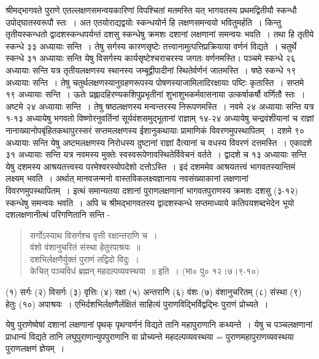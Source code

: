 श्रीमद्भागवते पुराणे एतल्लक्षणसमन्वयकारिणां विपश्चितां मतमस्ति यत् भागवतस्य प्रथमद्वितीयौ स्कन्धौ उपोद्घातस्वरूपौ स्तः~। अत एतयोराद्यद्वयोः स्कन्धयोर्न हि लक्षणसमन्वयो भवितुमर्हति~। किन्तु तृतीयस्कन्धतो द्वादशस्कन्धपर्यन्तं दशसु स्कन्धेषु क्रमशः दशानां लक्षणानां समन्वयः भवति~। तथा हि तृतीये स्कन्धे ३३ अध्यायाः सन्ति~। तेषु सर्गस्य कारणसृष्टेः तत्त्वानामुत्पत्तिप्रक्रियाया वर्णनं विद्यते~। चतुर्थे स्कन्धे ३१ अध्यायाः सन्ति येषु विसर्गस्य कार्यसृष्टेश्चराचरस्य जगतः वर्णनमस्ति। पञ्चमे स्कन्धे २६ अध्यायाः सन्ति यत्र तृतीयलक्षणस्य स्थानस्य जम्बूद्वीपादीनां स्थितेर्वर्णनं जातमस्ति~। षष्ठे स्कन्धे १९ अध्यायाः सन्ति~। तेषु चतुर्थलक्षणस्यानुग्रहणरूपस्य पोषणस्याजामिलादिरक्षायाः पष्टिः कृतास्ति~। सप्तमे १९ अध्यायाः सन्ति~। ऊतेः प्रह्लादहिरण्यकशिपुप्रभृतीनां शुभाशुभकर्मवासनाया उत्कर्षाकर्षौ वर्णितौ स्तः~। अष्टमे २४ अध्यायाः सन्ति~। तेषु षष्ठलक्षणस्य मन्वन्तरस्य निरूपणमस्ति~। नवमे २४ अध्यायाः सन्ति यत्र १-१३ अध्यायेषु भगवतो विष्णोरनुवर्तिनां सूर्यवंशसमुद्भूतानां राज्ञाम् १४-२४ अध्यायेषु चन्द्रवंशीयानां च राज्ञां नानाख्यानोपबृंहितकथापुरस्सरं सप्तमलक्षणस्य ईशानुकथायाः प्रामाणिकं विवरणमुपस्थापितम्~। दशमे ९० अध्यायाः सन्ति येषु अष्टमलक्षणस्य निरोधस्य दुष्टानां राज्ञां दैत्यानां च वधस्य विवरणं दत्तमस्ति~। एकादशे ३१ अध्यायाः सन्ति यत्र नवमस्य मुक्तेः स्वस्वरूपेणावस्थितेर्विवेचनं वर्तते~। द्वादशे च १३ अध्यायाः सन्ति येषु दशमस्य आश्रयतत्त्वस्य परमेश्वरस्योपदेशो दत्तोऽस्ति~। इदं दशममेव आश्रयतत्त्वं भागवतस्यान्तिमं लक्ष्यम् भवति~। अर्थात् मानवजन्मनो वास्तविकलक्ष्यज्ञानाय नवसंख्याकानां लक्षणानां विवरणमुपस्थापितम्~। इत्थं समान्यतया दशानां पुराणलक्षणानां भागवतपुराणस्य क्रमशः दशसु (३-१२) स्कन्धेषु समन्वयः भवति~। अपि च श्रीमद्भागवतस्य द्वादशस्कन्धे सप्तमाध्याये कतिपयशब्दभेदेन भूयो दशलक्षणानीत्थं परिगणितानि सन्ति -
\begin{verse}
सर्गोऽस्याथ विसर्गश्च वृत्ती रक्षान्तराणि च~।\\
वंशो वंशानुचरितं संस्था हेतुरपाश्रयः~॥\\
दशभिर्लक्षणैर्युक्तं पुराणं तद्विदो विदुः~।\\
केचित् पञ्चविधं ब्रह्मन् महदल्पव्यवस्थया~॥ इति~। (भा० पु० १२।७।९-१०)
\end{verse}
(१) सर्गः (२) विसर्गः (३) वृत्तिः (४) रक्षा (५) अन्तराणि (६) वंशः (७) वंशानुचरितम् (८) संस्था (९) हेतुः (१०) अपाश्रयः~। एभिर्दशभिर्लक्षणैर्लक्षितं साहित्यं पुराणविद्भिर्विद्वद्भिः पुराणं प्रोच्यते~।

येषु पुराणेष्वेषां दशानां लक्षणानां पृथक् पृथग्वर्णनं विद्यते तानि महापुराणानि कथ्यन्ते~। येषु च पञ्चलक्षणानां प्राधान्यं विद्यते तानि लघुपुराणान्युपपुराणानि वा प्रोच्यन्ते महदल्पव्यवस्थया = पुराणमहापुराणव्यवस्थया पुराणलक्षणं ज्ञेयम्~।

